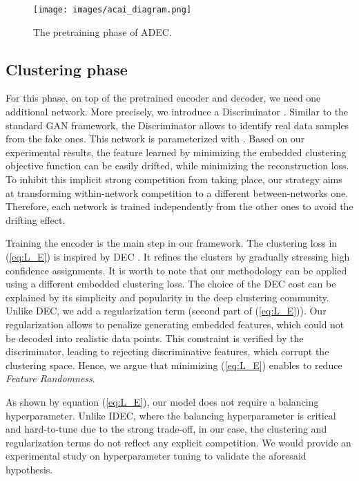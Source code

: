 \documentclass{article}
\begin{document}
\begin{figure}[ht]
\vskip 0.2in
\begin{center}
\centerline{\texttt{[image: images/acai\_diagram.png]}}
\caption{The pretraining phase of ADEC.}
\label{fig:pretraining}
\end{center}
\end{figure}

\subsection{Clustering phase}
For this phase, on top of the pretrained encoder and decoder, we need one additional network. More precisely, we introduce a Discriminator . Similar to the standard GAN framework, the Discriminator allows to identify real data samples from the fake ones. This network is parameterized with . Based on our experimental results, the feature learned by minimizing the embedded clustering objective function can be easily drifted, while minimizing the reconstruction loss. To inhibit this implicit strong competition from taking place, our strategy aims at transforming within-network competition to a different between-networks one. Therefore, each network is trained independently from the other ones to avoid the drifting effect. 

Training the encoder is the main step in our framework. The clustering loss in (\ref{eq:L_E}) is inspired by DEC
\cite{paper27}. It refines the clusters by gradually stressing high confidence assignments. It is worth to note that our methodology can be applied using a different embedded clustering loss. The choice of the DEC cost can be explained by its simplicity and popularity in the deep clustering community. Unlike DEC, we add a regularization term (second part of (\ref{eq:L_E})). Our regularization allows to penalize generating embedded features, which could not be decoded into realistic data points. This constraint is verified by the discriminator, leading to rejecting discriminative features, which corrupt the clustering space. Hence, we argue that minimizing (\ref{eq:L_E}) enables to reduce \textit{Feature Randomness}.



As shown by equation (\ref{eq:L_E}), our model does not require a balancing hyperparameter. Unlike IDEC, where the balancing hyperparameter is critical and hard-to-tune due to the strong trade-off, in our case, the clustering and regularization terms do not reflect any explicit competition. We would provide an experimental study on hyperparameter tuning to validate the aforesaid hypothesis. 
\end{document}
